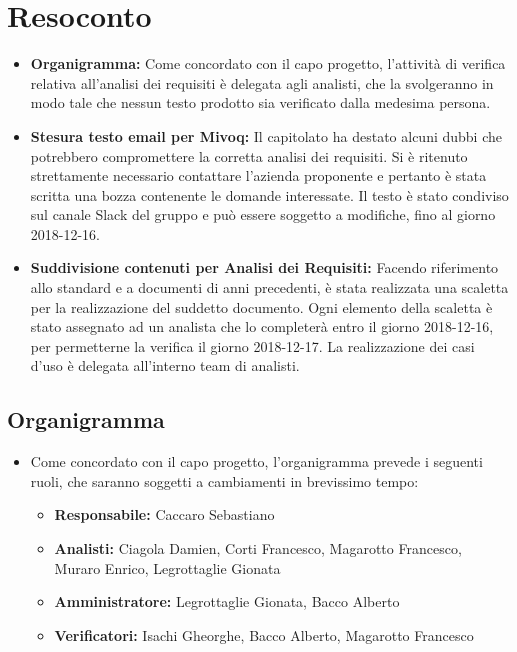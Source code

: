 \documentclass[a4paper, oneside, openany, dvipsnames, table]{article}
\begin{document}
\section{Resoconto}
\begin{itemize}
\item \textbf{Organigramma:} Come concordato con il capo progetto, l'attività di verifica relativa all'analisi dei requisiti è delegata agli analisti, che la svolgeranno in modo tale che nessun testo prodotto sia verificato dalla medesima persona.
\item \textbf{Stesura testo email per Mivoq: } Il capitolato ha destato alcuni dubbi che potrebbero compromettere la corretta analisi dei requisiti. Si è ritenuto strettamente necessario contattare l'azienda proponente e pertanto è stata scritta una bozza contenente le domande interessate. Il testo è stato condiviso sul canale Slack del gruppo e può essere soggetto a modifiche, fino al giorno 2018-12-16.
\item \textbf{Suddivisione contenuti per Analisi dei Requisiti:} Facendo riferimento allo standard e a documenti di anni precedenti, è stata realizzata una scaletta per la realizzazione del suddetto documento. Ogni elemento della scaletta è stato assegnato ad un analista che lo completerà entro il giorno 2018-12-16, per permetterne la verifica il giorno 2018-12-17.
La realizzazione dei casi d'uso è delegata all'interno team di analisti.
\end{itemize}
\subsection{Organigramma}
\begin{itemize}
\item Come concordato con il capo progetto, l'organigramma prevede i seguenti ruoli, che saranno soggetti a cambiamenti in brevissimo tempo:
	\begin{itemize}
	\item \textbf{Responsabile:} Caccaro Sebastiano
	\item \textbf{Analisti:} Ciagola Damien, Corti Francesco, Magarotto Francesco, Muraro Enrico, Legrottaglie Gionata
	\item \textbf{Amministratore:} Legrottaglie Gionata, Bacco Alberto
	\item \textbf{Verificatori:} Isachi Gheorghe, Bacco Alberto, Magarotto Francesco
	\end{itemize}
\end{itemize}
\end{document}
